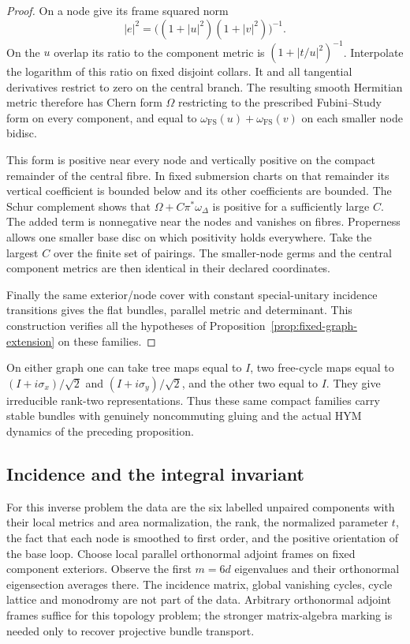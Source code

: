 \begin{proof}
On a node give its frame squared norm
\[
 |e|^2=\bigl((1+|u|^2)(1+|v|^2)\bigr)^{-1}.
\]
On the $u$ overlap its ratio to the
component metric is $(1+|t/u|^2)^{-1}$.
Interpolate the logarithm of this
ratio on fixed disjoint collars.
It and all tangential derivatives
restrict to zero on the central
branch. The resulting smooth Hermitian
metric therefore has Chern form
$\Omega$ restricting to the prescribed
Fubini--Study form on every component,
and equal to
$\omega_{\mathrm{FS}}(u)+\omega_{\mathrm{FS}}(v)$
on each smaller node bidisc.

This form is positive near every node
and vertically positive on the compact
remainder of the central fibre.
In fixed submersion charts on that
remainder its vertical coefficient
is bounded below and its other
coefficients are bounded. The Schur
complement shows that
$\Omega+C\pi^*\omega_\Delta$ is positive
for a sufficiently large $C$.
The added term is nonnegative near
the nodes and vanishes on fibres.
Properness allows one smaller base
disc on which positivity holds
everywhere. Take the largest $C$
over the finite set of pairings.
The smaller-node germs and the
central component metrics are
then identical in their declared
coordinates.

Finally the same exterior/node cover
with constant special-unitary
incidence transitions gives the flat
bundles, parallel metric and determinant.
This construction verifies all the
hypotheses of
Proposition~\ref{prop:fixed-graph-extension}
on these families.
\end{proof}

On either graph one can take tree
maps equal to $I$, two free-cycle
maps equal to $(I+i\sigma_x)/\sqrt2$
and $(I+i\sigma_y)/\sqrt2$, and the
other two equal to $I$. They give
irreducible rank-two representations.
Thus these same compact families
carry stable bundles with genuinely
noncommuting gluing and the actual
HYM dynamics of the preceding
proposition.

\subsection{Incidence and the integral invariant}
For this inverse problem the data are
the six labelled unpaired components
with their local metrics and area
normalization, the rank, the normalized
parameter $t$, the fact that each
node is smoothed to first order,
and the positive orientation of the
base loop. Choose local parallel
orthonormal adjoint frames on fixed
component exteriors. Observe the
first $m=6d$ eigenvalues and their
orthonormal eigensection averages
there. The incidence matrix, global
vanishing cycles, cycle lattice and
monodromy are not part of the data.
Arbitrary orthonormal adjoint frames
suffice for this topology problem;
the stronger matrix-algebra marking
is needed only to recover projective
bundle transport.

